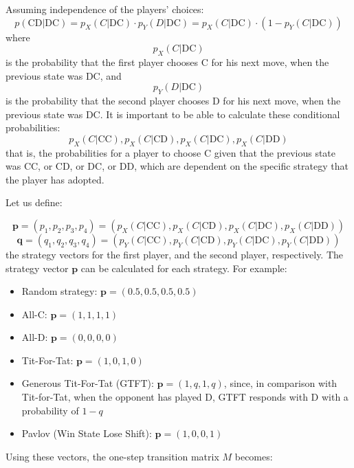 \documentclass[12pt]{report}
\begin{document}
Assuming independence of the players' choices:
\[
p(\text{CD}|\text{DC}) = p_X(C|\text{DC}) \cdot p_Y(D|\text{DC}) = p_X(C|\text{DC}) \cdot (1 - p_Y(C|\text{DC}))
\]
where \[
 p_X(C|\text{DC}) 
\]
is the probability that the first player chooses C for his next move, when the previous state was DC, and 
\[
 p_Y(D|\text{DC}) 
\]
is the probability that the second player chooses D for his next move, when the previous state was DC. It is important to be able to calculate these conditional probabilities: \[
p_X(C|\text{CC}) ,p_X(C|\text{CD}), p_X(C|\text{DC}), p_X(C|\text{DD}) 
\]
that is, the probabilities for a player to choose C given that the previous state was CC, or CD, or DC, or DD, which are dependent on the specific strategy that the player has adopted.

Let us define:

\[
\mathbf{p} = (p_1, p_2, p_3, p_4) = (p_X(C|\text{CC}), p_X(C|\text{CD}), p_X(C|\text{DC}), p_X(C|\text{DD}))
\]
\[
\mathbf{q} = (q_1, q_2, q_3, q_4) = (p_Y(C|\text{CC}), p_Y(C|\text{CD}), p_Y(C|\text{DC}), p_Y(C|\text{DD}))
\]
the strategy vectors for the first player, and the second player, respectively. The strategy vector $\mathbf{p}$ can be calculated for each strategy.
For example:
\begin{itemize}
  \item Random strategy: \( \mathbf{p} = (0.5, 0.5, 0.5, 0.5) \)
  \item All-C: \( \mathbf{p} = (1, 1, 1, 1) \)
  \item All-D: \( \mathbf{p} = (0, 0, 0, 0) \)
  \item Tit-For-Tat: \( \mathbf{p} = (1, 0, 1, 0) \)
  \item Generous Tit-For-Tat (GTFT): \( \mathbf{p} = (1, q, 1, q) \), since, in comparison with Tit-for-Tat, when the opponent has played D, GTFT responds with D with a probability of $1-q$
  \item Pavlov (Win State Lose Shift): \( \mathbf{p} = (1, 0, 0, 1) \)
\end{itemize}

Using these vectors, the one-step transition matrix \( M \) becomes:
\end{document}
